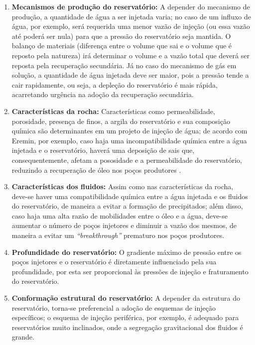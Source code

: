 \begin{enumerate}
\item \textbf{Mecanismos de produ\c{c}\~{a}o do reservat\'{o}rio:} A depender do mecanismo de produ\c{c}\~{a}o, a quantidade de \'{a}gua a ser injetada varia; no caso de um influxo de \'{a}gua, por exemplo, ser\'{a} requerida uma menor vaz\~{a}o de inje\c{c}\~{a}o (ou essa vaz\~{a}o at\'{e} poder\'{a} ser nula) para que a press\~{a}o do reservat\'{o}rio seja mantida. O balan\c{c}o de materiais (diferen\c{c}a entre o volume que sai e o volume que \'{e} reposto pela natureza) ir\'{a} determinar o volume e a vaz\~{a}o total que dever\'{a} ser reposta pela recupera\c{c}\~{a}o secund\'{a}ria. J\'{a} no caso do mecanismo de g\'{a}s em solu\c{c}\~{a}o, a quantidade de \'{a}gua injetada deve ser maior, pois a press\~{a}o tende a cair rapidamente, ou seja, a deple\c{c}\~{a}o do reservat\'{o}rio \'{e} mais r\'{a}pida, acarretando urg\^{e}ncia na ado\c{c}\~{a}o da recupera\c{c}\~{a}o secund\'{a}ria.

\item \textbf{Caracter\'{i}sticas da rocha:} Caracter\'{i}sticas como permeabilidade, porosidade, presen\c{c}a de finos, a argila do reservat\'{o}rio e sua composi\c{c}\~{a}o qu\'{i}mica s\~{a}o determinantes em um projeto de inje\c{c}\~{a}o de \'{a}gua; de acordo com Eremin, por exemplo, caso haja uma incompatibilidade qu\'{i}mica entre a \'{a}gua injetada e o reservat\'{o}rio, haver\'{a} uma deposi\c{c}\~{a}o de sais que, consequentemente, afetam a pososidade e a permeabilidade do reservat\'{o}rio, reduzindo a recupera\c{c}\~{a}o de \'{o}leo nos po\c{c}os produtores \cite{eremin}.

\item \textbf{Caracter\'{i}sticas dos fluidos:} Assim como nas caracter\'{i}sticas da rocha, deve-se haver uma compatibilidade qu\'{i}mica entre a \'{a}gua injetada e os fluidos do reservat\'{o}rio, de maneira a evitar a forma\c{c}\~{a}o de precipitados; al\'{e}m disso, caso haja uma alta raz\~{a}o de mobilidades entre o \'{o}leo e a \'{a}gua, deve-se aumentar o n\'{u}mero de po\c{c}os injetores e diminuir a vaz\~{a}o dos mesmos, de maneira a evitar um \textit{``breakthrough''} prematuro nos po\c{c}os produtores.

\item \textbf{Profundidade do reservat\'{o}rio:} O gradiente m\'{a}ximo de press\~{a}o entre os po\c{c}os injetores e o reservat\'{o}rio \'{e} diretamente influenciado pela sua profundidade, por esta ser proporcional \`{a}s press\~{o}es de inje\c{c}\~{a}o e fraturamento do reservat\'{o}rio.

\item \textbf{Conforma\c{c}\~{a}o estrutural do reservat\'{o}rio:} A depender da estrutura do reservat\'{o}rio, torna-se preferencial a ado\c{c}\~{a}o de esquemas de inje\c{c}\~{a}o espec\'{i}ficos; o esquema de inje\c{c}\~{a}o perif\'{e}rica, por exemplo, \'{e} adequado para reservat\'{o}rios muito inclinados, onde a segrega\c{c}\~{a}o gravitacional dos fluidos \'{e} grande.
\end{enumerate}

